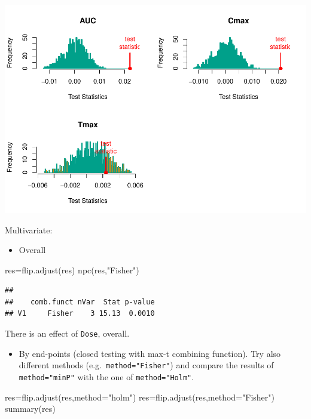 \documentclass[
]{article}
\newenvironment{Shaded}{\begin{snugshade}}{\end{snugshade}}
\newcommand{\AttributeTok}[1]{\textcolor[rgb]{0.77,0.63,0.00}{#1}}
\newcommand{\FunctionTok}[1]{\textcolor[rgb]{0.00,0.00,0.00}{#1}}
\newcommand{\NormalTok}[1]{#1}
\newcommand{\OtherTok}[1]{\textcolor[rgb]{0.56,0.35,0.01}{#1}}
\newcommand{\StringTok}[1]{\textcolor[rgb]{0.31,0.60,0.02}{#1}}
\providecommand{\tightlist}{%
  \setlength{\itemsep}{0pt}\setlength{\parskip}{0pt}}
\begin{document}
\begin{center}\includegraphics{perm_files/figure-latex/unnamed-chunk-42-1} \end{center}

Multivariate:

\begin{itemize}
\tightlist
\item
  Overall
\end{itemize}

\begin{Shaded}
\begin{Highlighting}[]
\NormalTok{res}\OtherTok{=}\FunctionTok{flip.adjust}\NormalTok{(res)}
\FunctionTok{npc}\NormalTok{(res,}\StringTok{"Fisher"}\NormalTok{)}
\end{Highlighting}
\end{Shaded}

\begin{verbatim}
## 
##    comb.funct nVar  Stat p-value
## V1     Fisher    3 15.13  0.0010
\end{verbatim}

There is an effect of \texttt{Dose}, overall.

\begin{itemize}
\tightlist
\item
  By end-points (closed testing with max-t combining function). Try also
  different methods (e.g.~\texttt{method="Fisher"}) and compare the
  results of \texttt{method="minP"} with the one of
  \texttt{method="Holm"}.
\end{itemize}

\begin{Shaded}
\begin{Highlighting}[]
\NormalTok{res}\OtherTok{=}\FunctionTok{flip.adjust}\NormalTok{(res,}\AttributeTok{method=}\StringTok{"holm"}\NormalTok{)}
\NormalTok{res}\OtherTok{=}\FunctionTok{flip.adjust}\NormalTok{(res,}\AttributeTok{method=}\StringTok{"Fisher"}\NormalTok{)}
\FunctionTok{summary}\NormalTok{(res)}
\end{Highlighting}
\end{Shaded}
\end{document}
